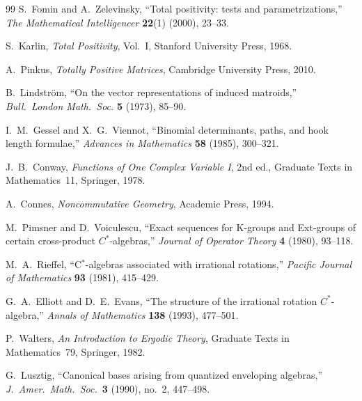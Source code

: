 \documentclass[11pt,oneside]{amsbook}
\numberwithin{equation}{section}
\theoremstyle{plain}
\theoremstyle{definition}
\theoremstyle{remark}
\begin{document}
\begin{thebibliography}{99}
S.~Fomin and A.~Zelevinsky,
\newblock ``Total positivity: tests and parametrizations,''
\newblock \emph{The Mathematical Intelligencer} \textbf{22}(1) (2000), 23--33.

S.~Karlin,
\newblock \emph{Total Positivity}, Vol.~I,
\newblock Stanford University Press, 1968.

A.~Pinkus,
\newblock \emph{Totally Positive Matrices},
\newblock Cambridge University Press, 2010.

B.~Lindstr\"om,
\newblock ``On the vector representations of induced matroids,''
\newblock \emph{Bull.\ London Math.\ Soc.} \textbf{5} (1973), 85--90.

I.~M.~Gessel and X.~G.~Viennot,
\newblock ``Binomial determinants, paths, and hook length formulae,''
\newblock \emph{Advances in Mathematics} \textbf{58} (1985), 300--321.




J.~B.~Conway,
\newblock \emph{Functions of One Complex Variable I},
\newblock 2nd ed., Graduate Texts in Mathematics~11, Springer, 1978.




A.~Connes,
\newblock \emph{Noncommutative Geometry},
\newblock Academic Press, 1994.

M.~Pimsner and D.~Voiculescu,
\newblock ``Exact sequences for K-groups and Ext-groups of certain cross-product $C^*$-algebras,''
\newblock \emph{Journal of Operator Theory} \textbf{4} (1980), 93--118.

M.~A.~Rieffel,
\newblock ``C$^*$-algebras associated with irrational rotations,''
\newblock \emph{Pacific Journal of Mathematics} \textbf{93} (1981), 415--429.

G.~A.~Elliott and D.~E.~Evans,
\newblock ``The structure of the irrational rotation $C^*$-algebra,''
\newblock \emph{Annals of Mathematics} \textbf{138} (1993), 477--501.

P.~Walters,
\newblock \emph{An Introduction to Ergodic Theory},
\newblock Graduate Texts in Mathematics~79, Springer, 1982.





G.~Lusztig,
\newblock ``Canonical bases arising from quantized enveloping algebras,''
\newblock \emph{J.\ Amer.\ Math.\ Soc.}\ \textbf{3} (1990), no.~2, 447--498.


\end{thebibliography}
\end{document}
